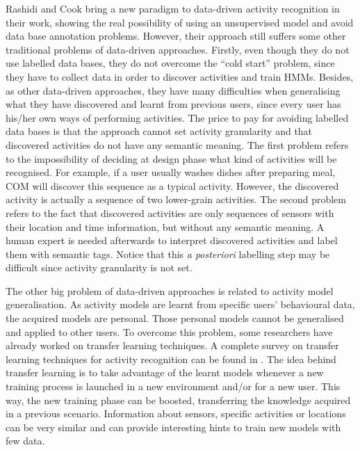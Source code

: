Rashidi and Cook bring a new paradigm to data-driven activity recognition in their work, showing the real possibility of using an unsupervised model and avoid data base annotation problems. However, their approach still suffers some other traditional problems of data-driven approaches. Firstly, even though they do not use labelled data bases, they do not overcome the ``cold start'' problem, since they have to collect data in order to discover activities and train HMMs. Besides, as other data-driven approaches, they have many difficulties when generalising what they have discovered and learnt from previous users, since every user has his/her own ways of performing activities. The price to pay for avoiding labelled data bases is that the approach cannot set activity granularity and that discovered activities do not have any semantic meaning. The first problem refers to the impossibility of deciding at design phase what kind of activities will be recognised. For example, if a user usually washes dishes after preparing meal, COM will discover this sequence as a typical activity. However, the discovered activity is actually a sequence of two lower-grain activities. The second problem refers to the fact that discovered activities are only sequences of sensors with their location and time information, but without any semantic meaning. A human expert is needed afterwards to interpret discovered activities and label them with semantic tags. Notice that this \textit{a posteriori} labelling step may be difficult since activity granularity is not set. 

The other big problem of data-driven approaches is related to activity model generalisation. As activity models are learnt from specific users' behavioural data, the acquired models are personal. Those personal models cannot be generalised and applied to other users. To overcome this problem, some researchers have already worked on transfer learning techniques. A complete survey on transfer learning techniques for activity recognition can be found in \cite{Cook2013}. The idea behind transfer learning is to take advantage of the learnt models whenever a new training process is launched in a new environment and/or for a new user. This way, the new training phase can be boosted, transferring the knowledge acquired in a previous scenario. Information about sensors, specific activities or locations can be very similar and can provide interesting hints to train new models with few data. 


